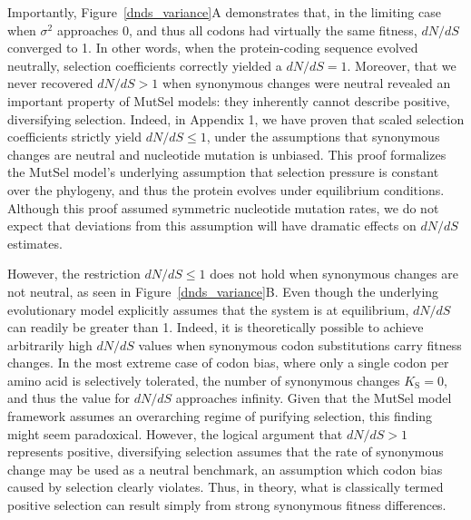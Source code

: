 \documentclass[11pt]{article}
\begin{document}
Importantly, Figure~\ref{dnds_variance}A demonstrates that, in the limiting case when $\sigma^2$ approaches 0, and thus all codons had virtually the same fitness, $dN/dS$ converged to 1. In other words, when the protein-coding sequence evolved neutrally, selection coefficients correctly yielded a $dN/dS = 1$. Moreover, that we never recovered $dN/dS > 1$ when synonymous changes were neutral revealed an important property of MutSel models: they inherently cannot describe positive, diversifying selection. Indeed, in Appendix 1, we have proven that scaled selection coefficients strictly yield $dN/dS \leq 1$, under the assumptions that synonymous changes are neutral and nucleotide mutation is unbiased. This proof formalizes the MutSel model's underlying assumption that selection pressure is constant over the phylogeny, and thus the protein evolves under equilibrium conditions. Although this proof assumed symmetric nucleotide mutation rates, we do not expect that deviations from this assumption will have dramatic effects on $dN/dS$ estimates. 

However, the restriction $dN/dS \leq 1$ does not hold when synonymous changes are not neutral, as seen in Figure~\ref{dnds_variance}B. Even though the underlying evolutionary model explicitly assumes that the system is at equilibrium, $dN/dS$ can readily be greater than 1. Indeed, it is theoretically possible to achieve arbitrarily high $dN/dS$ values when synonymous codon substitutions carry fitness changes. In the most extreme case of codon bias, where only a single codon per amino acid is selectively tolerated, the number of synonymous changes $K_\text{S} = 0$, and thus the value for $dN/dS$ approaches infinity. Given that the MutSel model framework assumes an overarching regime of purifying selection, this finding might seem paradoxical. However, the logical argument that $dN/dS > 1$ represents positive, diversifying selection assumes that the rate of synonymous change may be used as a neutral benchmark, an assumption which codon bias caused by selection clearly violates. Thus, in theory, what is classically termed positive selection can result simply from strong synonymous fitness differences. 	
		
\end{document}
